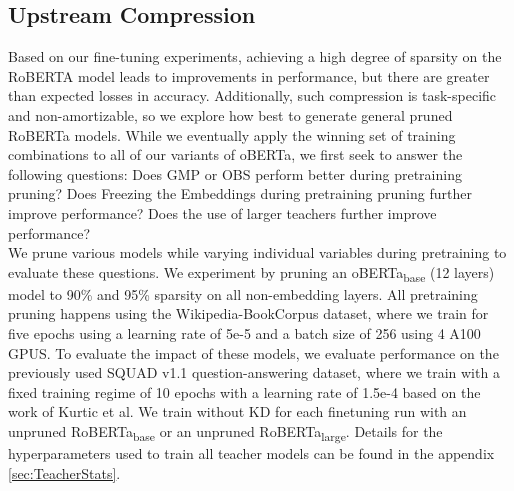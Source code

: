 \subsection{Upstream Compression}
Based on our fine-tuning experiments, achieving a high degree of sparsity on the RoBERTA model leads to improvements in performance, but there are greater than expected losses in accuracy. Additionally, such compression is task-specific and non-amortizable, so we explore how best to generate general pruned RoBERTa models. While we eventually apply the winning set of training combinations to all of our variants of oBERTa, we first seek to answer the following questions: Does GMP or OBS perform better during pretraining pruning? Does Freezing the Embeddings during pretraining pruning further improve performance? Does the use of larger teachers further improve performance? \\
We prune various models while varying individual variables during pretraining to evaluate these questions. We experiment by pruning an oBERTa\textsubscript{base} (12 layers) model to 90\% and 95\% sparsity on all non-embedding layers. All pretraining pruning happens using the Wikipedia-BookCorpus dataset, where we train for five epochs using a learning rate of 5e-5 and a batch size of 256 using 4 A100 GPUS. To evaluate the impact of these models, we evaluate performance on the previously used SQUAD v1.1 question-answering dataset, where we train with a fixed training regime of 10 epochs with a learning rate of 1.5e-4 based on the work of Kurtic et al. We train without KD for each finetuning run with an unpruned RoBERTa\textsubscript{base} or an unpruned RoBERTa\textsubscript{large}. Details for the hyperparameters used to train all teacher models can be found in the appendix \ref{sec:TeacherStats}.  \\
